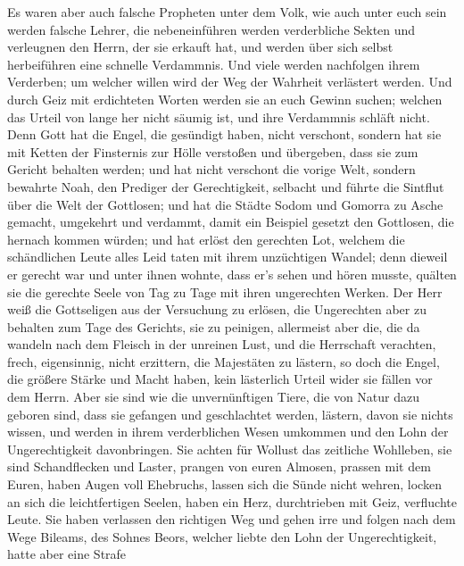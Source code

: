  Es waren aber auch falsche Propheten unter dem Volk, wie
auch unter euch sein werden falsche Lehrer, die nebeneinführen werden
verderbliche Sekten und verleugnen den Herrn, der sie erkauft hat, und
werden über sich selbst herbeiführen eine schnelle Verdammnis.
 Und viele werden nachfolgen ihrem Verderben; um welcher
willen wird der Weg der Wahrheit verlästert werden.  Und
durch Geiz mit erdichteten Worten werden sie an euch Gewinn suchen;
welchen das Urteil von lange her nicht säumig ist, und ihre Verdammnis
schläft nicht.  Denn Gott hat die Engel, die gesündigt
haben, nicht verschont, sondern hat sie mit Ketten der Finsternis zur
Hölle verstoßen und übergeben, dass sie zum Gericht behalten werden;
 und hat nicht verschont die vorige Welt, sondern bewahrte
Noah, den Prediger der Gerechtigkeit, selbacht und führte die Sintflut
über die Welt der Gottlosen;  und hat die Städte Sodom und
Gomorra zu Asche gemacht, umgekehrt und verdammt, damit ein Beispiel
gesetzt den Gottlosen, die hernach kommen würden;  und hat
erlöst den gerechten Lot, welchem die schändlichen Leute alles Leid
taten mit ihrem unzüchtigen Wandel;  denn dieweil er
gerecht war und unter ihnen wohnte, dass er's sehen und hören musste,
quälten sie die gerechte Seele von Tag zu Tage mit ihren ungerechten
Werken.  Der Herr weiß die Gottseligen aus der Versuchung
zu erlösen, die Ungerechten aber zu behalten zum Tage des Gerichts, sie
zu peinigen,  allermeist aber die, die da wandeln nach
dem Fleisch in der unreinen Lust, und die Herrschaft verachten, frech,
eigensinnig, nicht erzittern, die Majestäten zu lästern, 
so doch die Engel, die größere Stärke und Macht haben, kein lästerlich
Urteil wider sie fällen vor dem Herrn.  Aber sie sind wie
die unvernünftigen Tiere, die von Natur dazu geboren sind, dass sie
gefangen und geschlachtet werden, lästern, davon sie nichts wissen, und
werden in ihrem verderblichen Wesen umkommen  und den
Lohn der Ungerechtigkeit davonbringen. Sie achten für Wollust das
zeitliche Wohlleben, sie sind Schandflecken und Laster, prangen von
euren Almosen, prassen mit dem Euren,  haben Augen voll
Ehebruchs, lassen sich die Sünde nicht wehren, locken an sich die
leichtfertigen Seelen, haben ein Herz, durchtrieben mit Geiz, verfluchte
Leute.  Sie haben verlassen den richtigen Weg und gehen
irre und folgen nach dem Wege Bileams, des Sohnes Beors, welcher liebte
den Lohn der Ungerechtigkeit,  hatte aber eine Strafe
